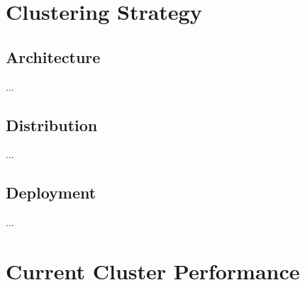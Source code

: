 \documentclass[12pt]{article}
\begin{document}


\newpage
\section{Clustering Strategy} \label{strategy} %

\subsection{Architecture} \label{strategy.architecture} %


...

\subsection{Distribution} \label{strategy.distribution} %


...

\subsection{Deployment} \label{strategy.deployment} %


...

\newpage
\section{Current Cluster Performance} \label{performance} %
\end{document}
